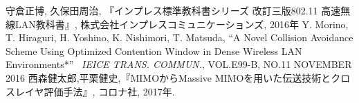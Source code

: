 \documentclass[a4paper, 10pt]{ltjsarticle}
\begin{document}

\begin{thebibliography}{9}
  守倉正博, 久保田周治, 『インプレス標準教科書シリーズ 改訂三版802.11 高速無線LAN教科書』, 株式会社インプレスコミュニケーションズ, 2016年
  Y. Morino, T. Hiraguri, H. Yoshino, K. Nishimori, T. Matsuda, ``A Novel Collision Avoidance Scheme Using Optimized Contention Window in Dense Wireless LAN Environments*'' \, \textit{IEICE TRANS. COMMUN.}, VOL.E99-B, NO.11 NOVEMBER 2016
  西森健太郎,平栗健史,『MIMOからMassive MIMOを用いた伝送技術とクロスレイヤ評価手法』, コロナ社, 2017年.
\end{thebibliography}
\end{document}
